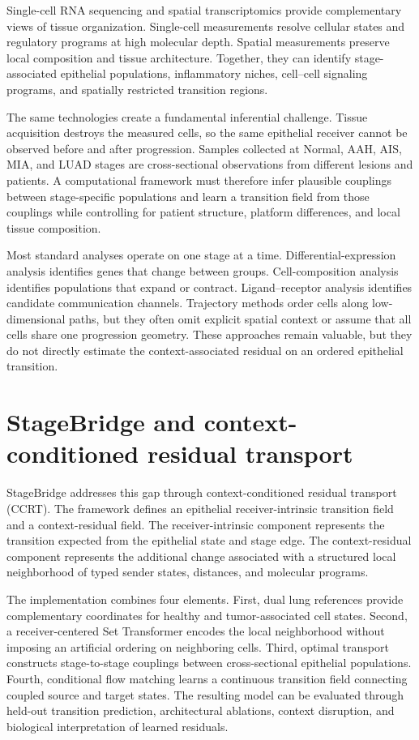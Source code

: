 Single-cell RNA sequencing and spatial transcriptomics provide complementary views of tissue organization. Single-cell measurements resolve cellular states and regulatory programs at high molecular depth. Spatial measurements preserve local composition and tissue architecture. Together, they can identify stage-associated epithelial populations, inflammatory niches, cell--cell signaling programs, and spatially restricted transition regions.

The same technologies create a fundamental inferential challenge. Tissue acquisition destroys the measured cells, so the same epithelial receiver cannot be observed before and after progression. Samples collected at Normal, AAH, AIS, MIA, and LUAD stages are cross-sectional observations from different lesions and patients. A computational framework must therefore infer plausible couplings between stage-specific populations and learn a transition field from those couplings while controlling for patient structure, platform differences, and local tissue composition.

Most standard analyses operate on one stage at a time. Differential-expression analysis identifies genes that change between groups. Cell-composition analysis identifies populations that expand or contract. Ligand--receptor analysis identifies candidate communication channels. Trajectory methods order cells along low-dimensional paths, but they often omit explicit spatial context or assume that all cells share one progression geometry. These approaches remain valuable, but they do not directly estimate the context-associated residual on an ordered epithelial transition.

\section{StageBridge and context-conditioned residual transport}

StageBridge addresses this gap through context-conditioned residual transport (CCRT). The framework defines an epithelial receiver-intrinsic transition field and a context-residual field. The receiver-intrinsic component represents the transition expected from the epithelial state and stage edge. The context-residual component represents the additional change associated with a structured local neighborhood of typed sender states, distances, and molecular programs.

The implementation combines four elements. First, dual lung references provide complementary coordinates for healthy and tumor-associated cell states. Second, a receiver-centered Set Transformer encodes the local neighborhood without imposing an artificial ordering on neighboring cells. Third, optimal transport constructs stage-to-stage couplings between cross-sectional epithelial populations. Fourth, conditional flow matching learns a continuous transition field connecting coupled source and target states. The resulting model can be evaluated through held-out transition prediction, architectural ablations, context disruption, and biological interpretation of learned residuals.

